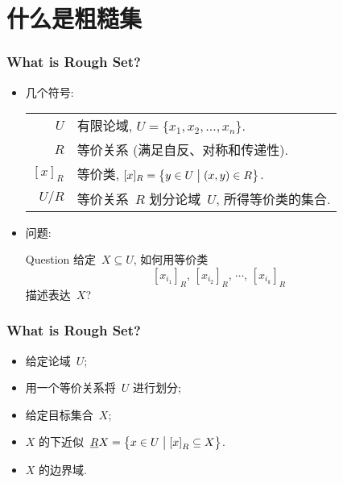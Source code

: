 \documentclass[notheorems,mathserif,table]{beamer}
\def\hilite<#1>{\temporal<#1>{\color{blue!35}}{\color{magenta}}{\color{blue!75}}}
\begin{document}
\section{什么是粗糙集}
\begin{frame}\frametitle{What is Rough Set?}
\begin{itemize}
 \item 几个符号:
 \begin{center}
  \setlength{\extrarowheight}{1.5mm}
   \begin{tabular}{rl}
      $U$         & 有限论域, $U=\big\{x_1,x_2 , \ldots ,x_n\big\}$.                 \\
      $R$         & 等价关系 (满足自反、对称和传递性).                                 \\
      ${[x]_R}$   & 等价类,  $[x]_R = \big\{ y \in U \bigm|\left( {x,y} \right) \in R\big\}$. \\
      $U/R$       & 等价关系~$R$ 划分论域~$U$, 所得等价类的集合.              \\
    \end{tabular}
 \end{center}\pause
  \item {\heiti 问题: }

  \begin{alertblock}{Question}
     给定~$ X \subseteq U$, 如何用等价类
     \[
     \left[ {x_{i_1} } \right]_R,\, \left[ {x_{i_2} } \right]_R,\, \cdots,\, \left[{x_{i_k} }\right]_R
     \]
    描述表达~$X$?
  \end{alertblock}
\end{itemize}
\end{frame}
\begin{frame}
\frametitle{What is Rough Set?}
\begin{itemize}
\hilite<1> \item 给定论域~$U$;  %
\hilite<2> \item 用一个等价关系将~$U$ 进行划分;
\hilite<3> \item 给定目标集合~$X$;
\hilite<4> \item $X$ 的下近似~$\underline R X  =\left\{ {x \in U\bigm|\left[ x \right]_R  \subseteq X} \right\}$.
\hilite<5> \item $X$ 的边界域.
\end{itemize}

\end{frame}
\end{document}
